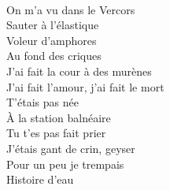 \\
On m'a vu dans le Vercors \\
Sauter à l'élastique \\
Voleur d'amphores \\
Au fond des criques \\
J'ai fait la cour à des murènes \\
J'ai fait l'amour, j'ai fait le mort \\
T'étais pas née \\
À la station balnéaire \\
Tu t'es pas fait prier \\
J'étais gant de crin, geyser \\
Pour un peu je trempais \\
Histoire d'eau \\


